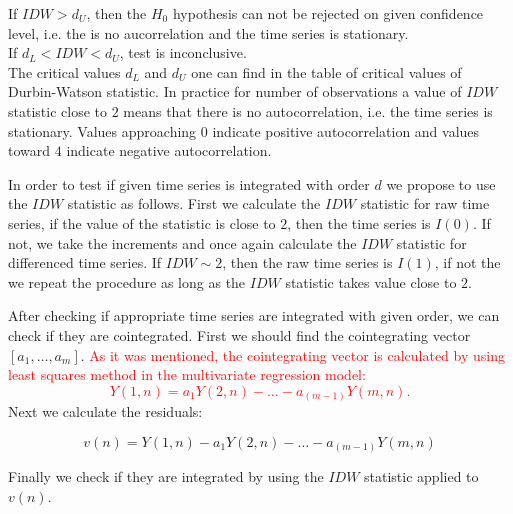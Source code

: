 \documentclass[preprint]{elsarticle}
\begin{document}
{If $IDW>d_U$, then the $H_0$ hypothesis can not be rejected on given confidence level, i.e. the is no aucorrelation and the time series is stationary.\\
If $d_L<IDW<d_U$, test is inconclusive.\\
The critical values $d_L$ and $d_U$ one can find in the table of critical values of Durbin-Watson statistic.
In practice for number of observations a value of $IDW$ statistic close to $2$ means that there is no autocorrelation, i.e. the time series is stationary. Values approaching $0$ indicate positive autocorrelation and values toward $4$ indicate negative autocorrelation.}

In order to test if given time series is integrated  with order $d$ we propose to use the $IDW$ statistic as follows. First we calculate the $IDW$ statistic for raw time series, if the value of the statistic is close to $2$, then the time series is $I(0)$. If not, we take the increments and once again calculate the $IDW$ statistic for differenced time series. If $IDW \sim 2$, then the raw time series is $I(1)$, if not the we repeat the procedure as long as the $IDW$ statistic takes value close to $2$. 

After checking if appropriate time series are integrated with given order, we can check if they are cointegrated. First we should find the cointegrating vector $[a_1,\dots,a_m]$.\textcolor{red}{ As it was mentioned, the cointegrating vector is calculated by using least squares method in the multivariate regression model:
$$Y(1,n)=a_1 Y(2,n)-\dots -a_{(m-1)} Y(m,n).$$}
Next we calculate the residuals:

\begin{displaymath}
v(n)=Y(1,n)-a_1 Y(2,n)-\dots -a_{(m-1)} Y(m,n)
\end{displaymath}

Finally we check if they are integrated by using the $IDW$ statistic applied to $v(n)$.
\end{document}
